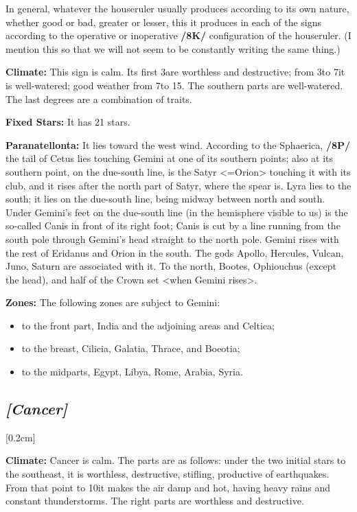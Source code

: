 \mndl[0.2cm]
In general, whatever the houseruler usually produces according to its own nature, whether good or bad, greater or lesser, this it produces in each of the signs according to the operative or inoperative \textbf{/8K/} configuration of the houseruler. (I mention this so that we will not seem to be constantly writing the same thing.)

\textbf{Climate:} This sign is calm. Its first 3\deg are worthless and destructive; from 3\deg to 7\deg it is well-watered; good weather from 7\deg to 15\deg. The southern parts are well-watered. The last degrees are a combination of traits.

\textbf{Fixed Stars:} It has 21 stars. 

\textbf{Paranatellonta:} It lies toward the west wind. According to the Sphaerica, \textbf{/8P/} the tail of Cetus lies touching Gemini at one of its southern points; also at its southern point, on the due-south line, is the Satyr
<=Orion> touching it with its club, and it rises after the north part of Satyr, where the spear is. Lyra lies to the south; it lies on the due-south line, being midway between north and south. Under Gemini’s feet on the due-south line (in the hemisphere visible to us) is the so-called Canis in front of its right foot; Canis is cut by a line running from the south pole through Gemini's head straight to the north pole. 
Gemini rises with the rest of Eridanus and Orion in the south. The gods Apollo, Hercules, Vulcan, Juno, Saturn are associated with it. To the north, Bootes, Ophiouchus (except the head), and half of the Crown set <when
Gemini rises>. 

\textbf{Zones:} The following zones are subject to Gemini: 
\begin{itemize}
\item to the front part, India and the adjoining areas
and Celtica; 
\item to the breast, Cilicia, Galatia, Thrace, and Boeotia; 
\item to the midparts, Egypt, Libya, Rome, Arabia, Syria.
\end{itemize}

\secbr
\subsection{\textit{[Cancer]}}
[0.2cm]

\textbf{Climate:} Cancer is calm. The parts are as follows: under the two initial stars to the southeast, it is worthless, destructive, stifling, productive of earthquakes. From that point to 10\deg it makes the air damp and hot, having heavy rains and constant thunderstorms. The right parts are worthless and destructive. 


